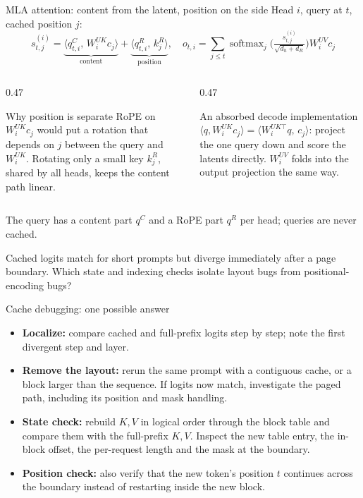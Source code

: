 \documentclass[handout]{beamer}
\begin{document}
\begin{frame}{MLA attention: content from the latent, position on the side}
  \footnotesize
  Head $i$, query at $t$, cached position $j$:
  {\small
  \[
    s^{(i)}_{t,j}=
    \underbrace{\big\langle q^C_{t,i},\,W^{UK}_i c_j\big\rangle}_{\text{content}}
    +\underbrace{\big\langle q^R_{t,i},\,k^R_j\big\rangle}_{\text{position}},
    \quad
    o_{t,i}=\sum_{j\le t}\operatorname{softmax}_j\!\Big(\tfrac{s^{(i)}_{t,j}}{\sqrt{d_h+d_R}}\Big)W^{UV}_i c_j
  \]}
  \begin{columns}[t]
    \begin{column}{0.47\linewidth}
      \begin{block}{Why position is separate}
        \footnotesize RoPE on $W^{UK}_ic_j$ would put a rotation that depends on $j$ between the query and $W^{UK}_i$. Rotating only a small key $k^R_j$, shared by all heads, keeps the content path linear.
      \end{block}
    \end{column}
    \begin{column}{0.47\linewidth}
      \begin{block}{An absorbed decode implementation}
        \footnotesize
        $\langle q,W^{UK}_ic_j\rangle=\langle W^{UK\top}_i q,\,c_j\rangle$: project the one query down and score the latents directly. $W^{UV}_i$ folds into the output projection the same way.
      \end{block}
    \end{column}
  \end{columns}
  \vfill
  \footnotesize The query has a content part $q^C$ and a RoPE part $q^R$ per head; queries are never cached.
\end{frame}

{Cached logits match for short prompts but diverge immediately after a page boundary. Which state and indexing checks isolate layout bugs from positional-encoding bugs?}

\begin{frame}{Cache debugging: one possible answer}
  \small
  \begin{itemize}
      \setlength{\itemsep}{8pt}
    \item \textbf{Localize:} compare cached and full-prefix logits step by step; note the first divergent step and layer.
    \item \textbf{Remove the layout:} rerun the same prompt with a contiguous cache, or a block larger than the sequence. If logits now match, investigate the paged path, including its position and mask handling.
    \item \textbf{State check:} rebuild $K,V$ in logical order through the block table and compare them with the full-prefix $K,V$. Inspect the new table entry, the in-block offset, the per-request length and the mask at the boundary.
    \item \textbf{Position check:} also verify that the new token's position $t$ continues across the boundary instead of restarting inside the new block.
  \end{itemize}
\end{frame}
\end{document}
